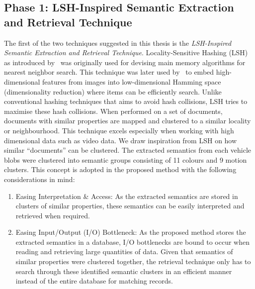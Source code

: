 \subsection{Phase 1: LSH-Inspired Semantic Extraction and Retrieval Technique}
\label{subsec:lsh-intro}
The first of the two techniques suggested in this thesis is the \textit{LSH-Inspired Semantic Extraction and Retrieval Technique}. Locality-Sensitive Hashing (LSH) as introduced by~ was originally used for devising main memory algorithms for nearest neighbor search. This technique was later used by~ to embed high-dimensional features from images into low-dimensional Hamming space (dimensionality reduction) where items can be efficiently search. 
Unlike conventional hashing techniques that aims to avoid hash collisions, LSH tries to maximise these hash collisions. When performed on a set of documents, documents with similar properties are mapped and clustered to a similar locality or neighbourhood. This technique excels especially when working with high dimensional data such as video data.
We draw inspiration from LSH on how similar ``documents'' can be clustered. %
The extracted semantics from each vehicle blobs were clustered into semantic groups consisting of 11 colours and 9 motion clusters. This concept is adopted in the proposed method with the following considerations in mind:
\begin{enumerate}
    \item Easing Interpretation \& Access: As the extracted semantics are stored in clusters of similar properties, these semantics can be easily interpreted and retrieved when required.
    \item Easing Input/Output (I/O) Bottleneck: As the proposed method stores the extracted semantics in a database, I/O bottlenecks are bound to occur when reading and retrieving large quantities of data. Given that semantics of similar properties were clustered together, the retrieval technique only has to search through these identified semantic clusters in an efficient manner instead of the entire database for matching records.
\end{enumerate}


\vspace{1em}
